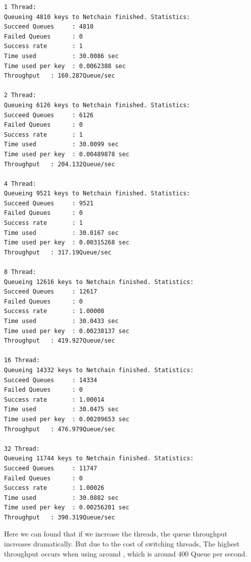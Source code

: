 \documentclass[11pt,oneside,a4paper]{article}
\begin{document}
\begin{enumerate}
   \begin{lstlisting}
1 Thread:
Queueing 4810 keys to Netchain finished. Statistics:
Succeed Queues     : 4810
Failed Queues      : 0
Success rate       : 1
Time used          : 30.0086 sec
Time used per key  : 0.0062388 sec
Throughput   : 160.287Queue/sec

2 Thread:
Queueing 6126 keys to Netchain finished. Statistics:
Succeed Queues     : 6126
Failed Queues      : 0
Success rate       : 1
Time used          : 30.0099 sec
Time used per key  : 0.00489878 sec
Throughput   : 204.132Queue/sec

4 Thread:
Queueing 9521 keys to Netchain finished. Statistics:
Succeed Queues     : 9521
Failed Queues      : 0
Success rate       : 1
Time used          : 30.0167 sec
Time used per key  : 0.00315268 sec
Throughput   : 317.19Queue/sec

8 Thread:
Queueing 12616 keys to Netchain finished. Statistics:
Succeed Queues     : 12617
Failed Queues      : 0
Success rate       : 1.00008
Time used          : 30.0433 sec
Time used per key  : 0.00238137 sec
Throughput   : 419.927Queue/sec

16 Thread:
Queueing 14332 keys to Netchain finished. Statistics:
Succeed Queues     : 14334
Failed Queues      : 0
Success rate       : 1.00014
Time used          : 30.0475 sec
Time used per key  : 0.00209653 sec
Throughput   : 476.979Queue/sec

32 Thread:
Queueing 11744 keys to Netchain finished. Statistics:
Succeed Queues     : 11747
Failed Queues      : 0
Success rate       : 1.00026
Time used          : 30.0882 sec
Time used per key  : 0.00256201 sec
Throughput   : 390.319Queue/sec

    \end{lstlisting}

Here we can found that if we increase the threads, the queue throughput increases dramatically. But due to the cost of switching threads, The highest throughput occurs when using around , which is around 400 Queue per second.

\end{enumerate}
\end{document}
